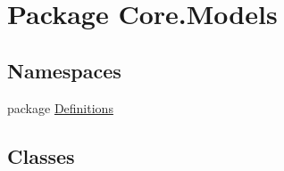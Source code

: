 \hypertarget{namespaceCore_1_1Models}{\section{Package Core.\-Models}
\label{namespaceCore_1_1Models}
}
\subsection*{Namespaces}
\begin{DoxyCompactItemize}
\item 
package \hyperlink{namespaceCore_1_1Models_1_1Definitions}{Definitions}
\end{DoxyCompactItemize}
\subsection*{Classes}
